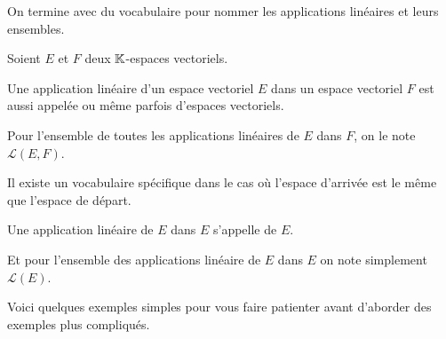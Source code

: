 \diapo

On termine avec du vocabulaire pour nommer les applications linéaires et leurs ensembles.


Soient $E$ et $F$ deux $\mathbb{K}$-espaces vectoriels.

Une application linéaire d'un espace vectoriel $E$ dans un espace vectoriel $F$ est 
  aussi appelée  ou même parfois  d'espaces vectoriels.

  Pour l'ensemble de toutes les applications linéaires de $E$ dans $F$, on le note $\mathcal{L}(E,F)$.
 
  \change
  
  Il existe un vocabulaire spécifique dans le cas où l'espace d'arrivée est le même que l'espace de départ.
   
  Une application linéaire de $E$ dans $E$ s'appelle  de $E$.
  
  Et pour l'ensemble des applications linéaire de $E$ dans $E$  on note simplement $\mathcal{L}(E)$.

\diapo

Voici quelques exemples simples pour vous faire patienter avant d'aborder des exemples plus compliqués.


